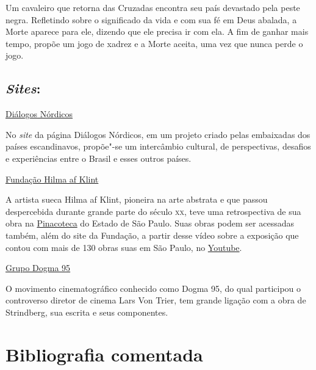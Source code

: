 \documentclass[12pt]{extarticle}
\begin{document}
Um cavaleiro que retorna das Cruzadas encontra seu país devastado pela peste negra. Refletindo sobre 
o significado da vida e com sua fé em Deus abalada, a Morte aparece para ele, dizendo que ele precisa ir 
com ela. A fim de ganhar mais tempo, propõe um jogo de xadrez e a Morte aceita, uma vez que nunca perde o 
jogo.

\subsection{\emph{Sites}:}

\href{https://www.dialogosnordicos.com/?fbclid=IwAR0XdcQuRZ3HH0mRrjc-z5BpiSHjWi9uj9mjTTrJ0GWvHTSsVQdf4tA4po8}{Diálogos Nórdicos}

No \emph{site} da página Diálogos Nórdicos, em um projeto criado pelas embaixadas dos países escandinavos, propõe"-se um 
intercâmbio cultural, de perspectivas, desafios e experiências entre o Brasil e esses outros países.

\href{https://www.hilmaafklint.se/en/}{Fundação Hilma af Klint}

A artista sueca Hilma af Klint, pioneira na arte abstrata e que passou despercebida durante grande parte do século \textsc{xx}, teve uma retrospectiva de sua obra na \href{https://pinacoteca.org.br/en/programacao/hilma-af-klint/}{Pinacoteca} do Estado de São Paulo. Suas obras podem ser acessadas também, além do site da Fundação, a partir desse vídeo sobre a exposição que contou com mais de 130 obras suas em São Paulo, no \href{https://www.youtube.com/watch?v=jBMQSHFEUaw&ab_channel=TVCRECI}{Youtube}.

\href{https://www.institutodecinema.com.br/mais/conteudo/movimentos-do-cinema-o-que-foi-o-dogma-95}{Grupo Dogma 95} 

O movimento cinematográfico conhecido como Dogma 95, do qual participou 
o controverso diretor de cinema Lars Von Trier, tem grande ligação com a obra de Strindberg, 
sua escrita e seus componentes.

\section{Bibliografia comentada}
\end{document}
